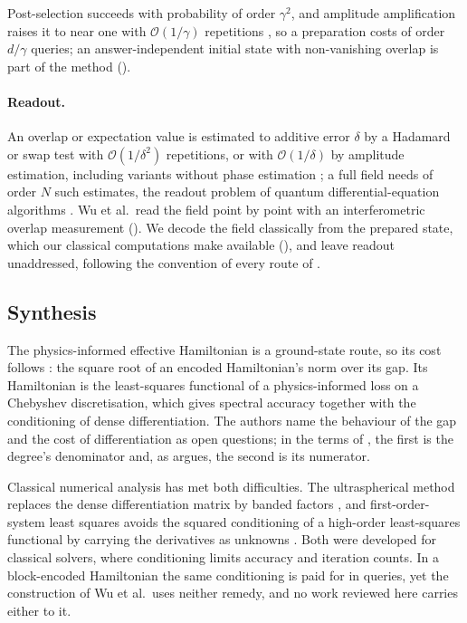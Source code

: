 Post-selection succeeds with probability of order $\gamma^2$, and amplitude amplification raises it to near one with $\mathcal O(1/\gamma)$ repetitions \cite{brassard2000amplitude}, so a preparation costs of order $d/\gamma$ queries; an answer-independent initial state with non-vanishing overlap is part of the method ().

\paragraph{Readout.} An overlap or expectation value is estimated to additive error $\delta$ by a Hadamard or swap test with $\mathcal O(1/\delta^2)$ repetitions, or with $\mathcal O(1/\delta)$ by amplitude estimation, including variants without phase estimation \cite{brassard2000amplitude,suzuki2020amplitude,grinko2021iterative}; a full field needs of order $N$ such estimates, the readout problem of quantum differential-equation algorithms \cite{williams2024readout,nishi2025overlap}. Wu et al.\ read the field point by point with an interferometric overlap measurement (). We decode the field classically from the prepared state, which our classical computations make available (), and leave readout unaddressed, following the convention of every route of .

\subsection{Synthesis}
\label{sec:bg-synthesis}

The physics-informed effective Hamiltonian is a ground-state route, so its cost follows : the square root of an encoded Hamiltonian's norm over its gap. Its Hamiltonian is the least-squares functional of a physics-informed loss on a Chebyshev discretisation, which gives spectral accuracy together with the conditioning of dense differentiation. The authors name the behaviour of the gap and the cost of differentiation as open questions; in the terms of , the first is the degree's denominator and, as  argues, the second is its numerator.

Classical numerical analysis has met both difficulties. The ultraspherical method replaces the dense differentiation matrix by banded factors \cite{olver2013}, and first-order-system least squares avoids the squared conditioning of a high-order least-squares functional by carrying the derivatives as unknowns \cite{cai1994fosls}. Both were developed for classical solvers, where conditioning limits accuracy and iteration counts. In a block-encoded Hamiltonian the same conditioning is paid for in queries, yet the construction of Wu et al.\ uses neither remedy, and no work reviewed here carries either to it.

